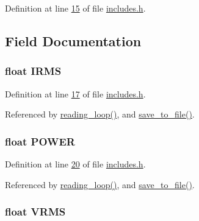 Definition at line \hyperlink{a00037_source_l00015}{15} of file \hyperlink{a00037_source}{includes.\-h}.



\subsection{Field Documentation}
\hypertarget{a00030_a4f87f30b543e89e2e5dfa1b8f3f58eff}{
\subsubsection[{I\-R\-M\-S}]{\setlength{\rightskip}{0pt plus 5cm}float I\-R\-M\-S}}\label{d5/d79/a00030_a4f87f30b543e89e2e5dfa1b8f3f58eff}


Definition at line \hyperlink{a00037_source_l00017}{17} of file \hyperlink{a00037_source}{includes.\-h}.



Referenced by \hyperlink{a00035_source_l00302}{reading\-\_\-loop()}, and \hyperlink{a00035_source_l00421}{save\-\_\-to\-\_\-file()}.

\hypertarget{a00030_a8a9794fa4c6a69b457d1eb04b017ef1e}{
\subsubsection[{P\-O\-W\-E\-R}]{\setlength{\rightskip}{0pt plus 5cm}float P\-O\-W\-E\-R}}\label{d5/d79/a00030_a8a9794fa4c6a69b457d1eb04b017ef1e}


Definition at line \hyperlink{a00037_source_l00020}{20} of file \hyperlink{a00037_source}{includes.\-h}.



Referenced by \hyperlink{a00035_source_l00302}{reading\-\_\-loop()}, and \hyperlink{a00035_source_l00421}{save\-\_\-to\-\_\-file()}.

\hypertarget{a00030_a08415029e214174a01bc6487ff98ee9b}{
\subsubsection[{V\-R\-M\-S}]{\setlength{\rightskip}{0pt plus 5cm}float V\-R\-M\-S}}\label{d5/d79/a00030_a08415029e214174a01bc6487ff98ee9b}


